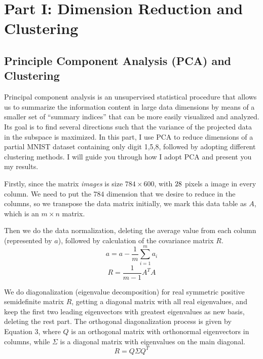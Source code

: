 \documentclass[a4paper,12pt]{article} %
\begin{document}
\section{Part I: Dimension Reduction and Clustering}
\subsection{Principle Component Analysis (PCA) and Clustering}
\hspace{0.7cm}
Principal component analysis is an unsupervised statistical procedure that allows us to summarize the information content in large data dimensions by means of a smaller set of “summary indices” that can be more easily visualized and analyzed. Its goal is to find several directions such that the variance of the projected data in the subspace is maximized. In this part, I use PCA to reduce dimensions of a partial MNIST dataset containing only digit 1,5,8, followed by adopting different clustering methods. I will guide you through how I adopt PCA and present you my results.

\hspace{0.7cm}
Firstly, since the matrix \emph{images} is size $784\times 600$, with $28\time 28$ pixels a image in every column. We need to put the $784$ dimension that we desire to reduce in the columns, so we transpose the data matrix initially, we mark this data table as $A$, which is an $m\times n$ matrix.

\hspace{0.7cm}
Then we do the data normalization, deleting the average value from each column (represented by  $a$), followed by calculation of the covariance matrix $R$.
\begin{equation}
	a=a-\frac{1}{m}\sum_{i=1}^m{a_i}
\end{equation}
\begin{equation}
	R=\frac{1}{m-1}A^TA
\end{equation}


\hspace{0.7cm}
We do diagonalization (eigenvalue decomposition) for real symmetric positive semidefinite matrix $R$, getting a diagonal matrix with all real eigenvalues, and keep the first two leading eigenvectors with greatest eigenvalues as new basis, deleting the rest part. The orthogonal diagonalization process is given by Equation 3, where $Q$ is an orthogonal matrix with orthonormal eigenvectors in columns, while $\varSigma$ is a diagonal matrix with eigenvalues on the main diagonal.
\begin{equation}
	R=Q\varSigma Q^T
\end{equation}
\end{document}
